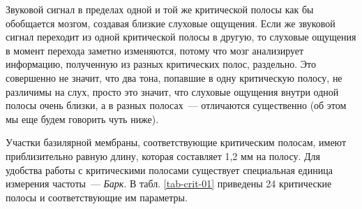 \documentclass[oneside, final, 14pt]{extreport}
\begin{document}
Звуковой сигнал в пределах одной и той же критической полосы как бы обобщается мозгом, создавая близкие слуховые ощущения. Если же звуковой сигнал переходит из одной критической полосы в другую, то слуховые ощущения в момент перехода заметно изменяются, потому что мозг анализирует информацию, полученную из разных критических полос, раздельно. Это совершенно не значит, что два тона, попавшие в одну критическую полосу, не различимы на слух, просто это значит, что слуховые ощущения внутри одной полосы очень близки, а в разных полосах~--- отличаются существенно (об этом мы еще будем говорить чуть ниже).

Участки базилярной мембраны, соответствующие критическим полосам, имеют
приблизительно равную длину, которая составляет 1,2 мм на полосу. Для удобства
работы с критическими полосами существует специальная единица измерения частоты~--- {\itshape Барк}. В табл. \ref{tab-crit-01} приведены 24 критические полосы и соответствующие им параметры.
\end{document}
